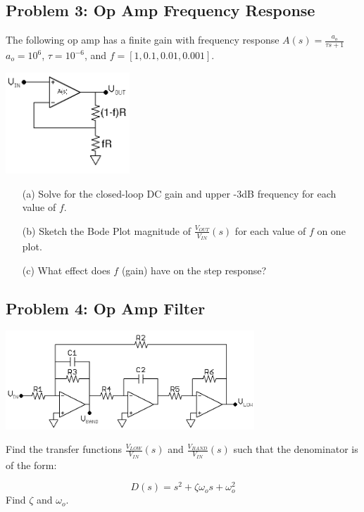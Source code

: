 \documentclass[11pt,twoside]{article}
\begin{document}
\subsection*{Problem 3: Op Amp Frequency Response}
	The following op amp has a finite gain with frequency response $A(s)=\frac{a_o}{\tau s+1}$ \\
	$a_o=10^6$, $\tau=10^{-6}$, and $f=[1, 0.1, 0.01, 0.001]$.
\begin{center}
\includegraphics[width=0.35\textwidth]{opamp.png}
\end{center}
\begin{enumerate}
	\item[(a)] Solve for the closed-loop DC gain and upper -3dB frequency for each value of $f$.
	\item[(b)] Sketch the Bode Plot magnitude of $\frac{V_{OUT}}{V_{IN}}(s)$ for each value of $f$ on one plot.
	\item[(c)] What effect does $f$ (gain) have on the step response?
\end{enumerate}

\subsection*{Problem 4: Op Amp Filter}
\begin{center}
\includegraphics[width=0.7\textwidth]{tow-thomas.png}
\end{center}
Find the transfer functions $\frac{V_{LOW}}{V_{IN}}(s)$ and $\frac{V_{BAND}}{V_{IN}}(s)$ such that the denominator is of the form: 

\begin{equation}
D(s) = s^2+\zeta\omega_os+\omega_o^2
\end{equation}
Find $\zeta$ and $\omega_o$.
\end{document}
